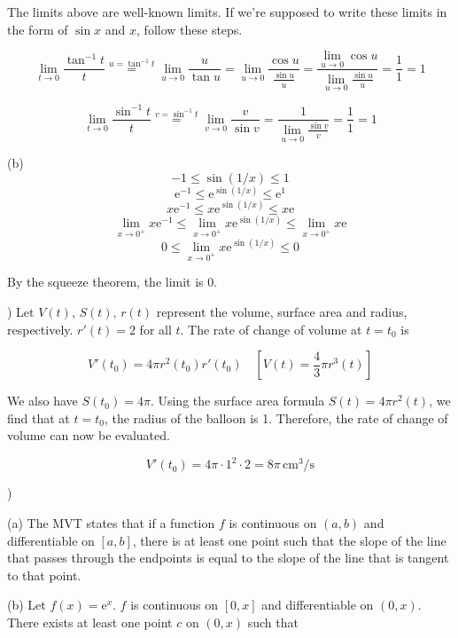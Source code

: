 \documentclass{article}
\begin{document}
\noindent The limits above are well-known limits. If we're supposed to write these limits in the form of $\sin x$ and $x$, follow these steps.

\[\lim_{t\to0}\frac{\tan^{-1} t}{t}\overset{u=\tan^{-1} t}{=}\lim_{u\to0}\frac u{\tan u} = \lim_{u\to0}\frac{\cos u}{\frac{\sin u}u}=\frac{\displaystyle \lim_{u\to0}\cos u}{\displaystyle\lim_{u\to0}\frac{\sin u}u} = \frac11 = 1\]

\[\lim_{t\to0}\frac{\sin^{-1} t}{t}\overset{v=\sin^{-1} t}{=}\lim_{v\to0}\frac v{\sin v} =\frac1{\displaystyle\lim_{u\to0}\frac{\sin v}v} = \frac11 = 1\]

\hfill

\noindent (b)
\[-1\leq\sin(1/x) \leq 1\]
\[\mathrm{e}^{-1}\leq\mathrm{e}^{\sin(1/x)} \leq \mathrm{e}^1\]
\[x\mathrm{e}^{-1}\leq x\mathrm{e}^{\sin(1/x)} \leq x\mathrm{e}\]
\[\lim_{x\to0^+}x\mathrm{e}^{-1}\leq \lim_{x\to0^+}x\mathrm{e}^{\sin(1/x)} \leq\lim_{x\to0^+}x\mathrm{e}\]
\[0\leq \lim_{x\to0^+}x\mathrm{e}^{\sin(1/x)} \leq0\]

\hfill

\noindent By the squeeze theorem, the limit is $\boxed{0}$.

\hfill

) Let $V(t),\,S(t),\,r(t)$ represent the volume, surface area and radius, respectively. $r'(t) = 2$ for all $t$. The rate of change of volume at $t=t_0$ is

\[V'(t_0) = 4\pi r^2(t_0)r'(t_0) \quad\left[V(t) = \frac43 \pi r^3(t)\right] \]

\hfill

\noindent We also have $S(t_0) = 4\pi$. Using the surface area formula $S(t) = 4\pi r^2(t)$, we find that at $t=t_0$, the radius of the balloon is 1. Therefore, the rate of change of volume can now be evaluated.

\[V'(t_0)=4\pi\cdot1^2\cdot2=\boxed{8\pi\,\text{cm}^3\text{/s}}\]

\newpage

)

\hfill

\noindent (a) The MVT states that if a function $f$ is continuous on $(a,b)$ and differentiable on $[a,b]$, there is at least one point such that the slope of the line that passes through the endpoints is equal to the slope of the line that is tangent to that point.

\hfill

\noindent (b) Let $f(x)=\mathrm{e}^x$. $f$ is continuous on $[0,x]$ and differentiable on $(0,x)$.  There exists at least one point $c$ on $(0,x)$ such that
\end{document}
